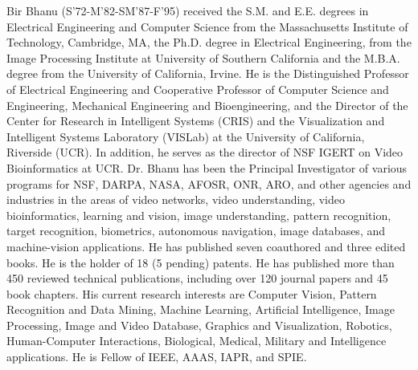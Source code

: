 \documentclass[10pt,journal]{IEEEtran}
\begin{document}
\begin{IEEEbiography}{Bir Bhanu}
(S'72-M'82-SM'87-F'95) received the S.M. and E.E. degrees in Electrical Engineering and Computer Science from the Massachusetts Institute of Technology, Cambridge, MA, the Ph.D. degree in Electrical Engineering, from the Image Processing Institute at University of Southern California and the M.B.A. degree from the University of California, Irvine. He is the Distinguished Professor of Electrical Engineering and Cooperative Professor of Computer Science and Engineering, Mechanical Engineering and Bioengineering, and the Director of the Center for Research in Intelligent Systems (CRIS) and the Visualization and Intelligent Systems Laboratory (VISLab) at the University of California, Riverside (UCR). In addition, he serves as the director of NSF IGERT on Video Bioinformatics at UCR. Dr. Bhanu has been the Principal Investigator of various programs for NSF, DARPA, NASA, AFOSR, ONR, ARO, and other agencies and industries in the areas of video networks, video understanding, video bioinformatics, learning and vision, image understanding, pattern recognition, target recognition, biometrics, autonomous navigation, image databases, and machine-vision applications. He has published seven coauthored and three edited books. He is the holder of 18 (5 pending) patents. He has published more than 450 reviewed technical publications, including over 120 journal papers and 45 book chapters. His current research interests are Computer Vision, Pattern Recognition and Data Mining, Machine Learning, Artificial Intelligence, Image Processing, Image and Video Database, Graphics and Visualization, Robotics, Human-Computer Interactions, Biological, Medical, Military and Intelligence applications. He is Fellow of IEEE, AAAS, IAPR, and SPIE.
\end{IEEEbiography}









\end{document}

